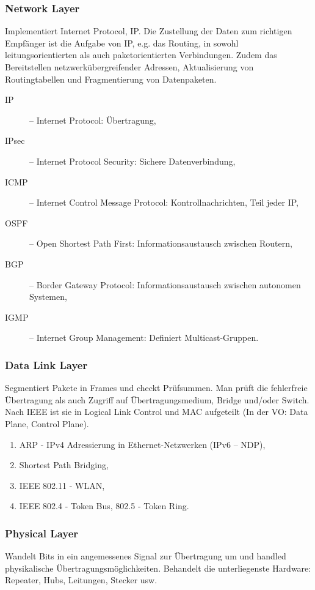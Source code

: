 \documentclass{scrartcl}
\begin{document}
    \subsubsection{Network Layer}
    \label{subsubsection:OSI_network_layer}
    Implementiert Internet Protocol, IP. Die Zustellung der Daten zum richtigen Empfänger ist die Aufgabe von IP, e.g. das Routing, in sowohl leitungsorientierten als auch paketorientierten Verbindungen. 
    Zudem das Bereitstellen netzwerkübergreifender Adressen, Aktualisierung von Routingtabellen und Fragmentierung von Datenpaketen. 
    \begin{description}
        \item [IP] -- Internet Protocol: Übertragung,
        \item [IPsec] -- Internet Protocol Security: Sichere Datenverbindung,
        \item [ICMP] -- Internet Control Message Protocol: Kontrollnachrichten, Teil jeder IP,
        \item [OSPF] -- Open Shortest Path First: Informationsaustausch zwischen Routern,
        \item [BGP] -- Border Gateway Protocol: Informationsaustausch zwischen autonomen Systemen,
        \item [IGMP] -- Internet Group Management: Definiert Multicast-Gruppen.
    \end{description}

    \subsubsection{Data Link Layer}
    \label{subsubsection:OSI_data_link_layer}
    Segmentiert Pakete in Frames und checkt Prüfsummen. 
    Man prüft die fehlerfreie Übertragung als auch Zugriff auf Übertragungsmedium, 
    Bridge und/oder Switch. Nach IEEE ist sie in Logical Link Control und MAC aufgeteilt (In der VO: Data Plane, Control Plane). 
    
    \begin{enumerate}
        \item ARP - IPv4 Adressierung in Ethernet-Netzwerken (IPv6 -- NDP),
        \item Shortest Path Bridging,
        \item IEEE 802.11 - WLAN,
        \item IEEE 802.4 - Token Bus, 802.5 - Token Ring.
    \end{enumerate}

    \subsubsection{Physical Layer}
    \label{subsubsection:OSI_physical_layer}
    Wandelt Bits in ein angemessenes Signal zur Übertragung um und handled physikalische Übertragungsmöglichkeiten. 
    Behandelt die unterliegenste Hardware: Repeater, Hubs, Leitungen, Stecker usw.
    
\end{document}
